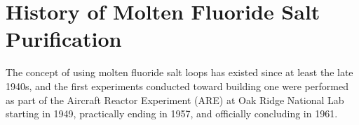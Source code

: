 %
%

\section{History of Molten Fluoride Salt Purification}
\label{sec: rev history}

The concept of using molten fluoride salt loops has existed since at
least the late 1940s, and the first experiments conducted toward
building one were performed as part of the Aircraft Reactor
Experiment (ARE) at Oak Ridge National Lab starting in 1949,
practically ending in 1957, and officially concluding in 1961. \par

